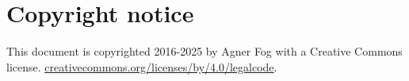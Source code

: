 \documentclass[forwardcom.tex]{subfiles}
\begin{document}
\RaggedRight

\chapter{Copyright notice}
This document is copyrighted 2016-2025 by Agner Fog with a Creative Commons license.
\href{https://creativecommons.org/licenses/by/4.0/legalcode}{creativecommons.org/licenses/by/4.0/legalcode}.
\end{document}
